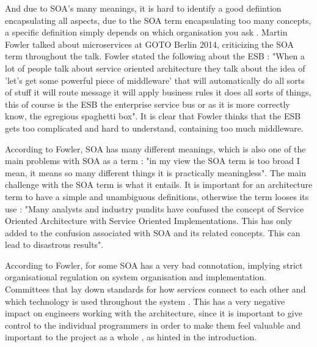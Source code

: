 {And due to SOA's many meanings, it is hard to identify a good defiintion encapsulating all aspects, due to the SOA term encapsulating too many concepts, a specific definition simply depends on which organisation you ask \cite{microsoft2017chapter}. Martin Fowler talked about microservices at GOTO Berlin 2014, criticizing the SOA term throughout the talk. Fowler stated the following about the ESB \cite[t.8.15]{fowler2014microservicesoamonolith}: "When a lot of people talk about service oriented architecture they talk about the idea of 'let's get some powerful piece of middleware' that will automatically do all sorts of stuff it will route message it will apply business rules it does all sorts of things, this of course is the ESB the enterprise service bus or as it is more correctly know, the egregious spaghetti box". It is clear that Fowler thinks that the ESB gets too complicated and hard to understand, containing too much middleware. 

According to Fowler, SOA has many different meanings, which is also one of the main problems with SOA as a term \cite[t.14:00]{fowler2014microservicesoamonolith}: "in my view the SOA term is too broad I mean, it means so many different things it is practically meaningless". The main challenge with the SOA term is what it entails. It is important for an architecture term to have a simple and unambiguous definitions, otherwise the term looses its use \cite{microsoft2017chapter}: "Many analysts and industry pundits have confused the concept of Service Oriented Architecture with Service Oriented Implementations. This has only added to the confusion associated with SOA and its related concepts. This can lead to disastrous results".

According to Fowler, for some SOA has a very bad connotation, implying strict organisational regulation on system organisation and implementation. Committees that lay down standards for how services connect to each other and which technology is used throughout the system \cite[t.13:12]{fowler2014microservicesoamonolith}. This has a very negative impact on engineers working with the architecture, since it is important to give control to the individual programmers in order to make them feel valuable and important to the project as a whole \cite[p.~16]{newman2015microservices}, as hinted in the introduction. 

}
